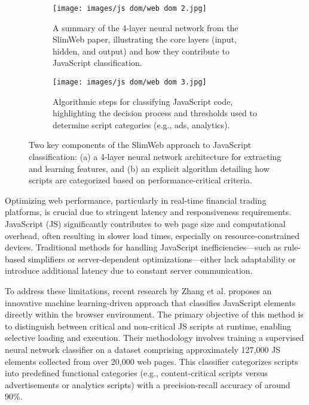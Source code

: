 \documentclass[a4paper, 11pt, twoside, openright]{report}
\begin{document}
\begin{figure}[ht]
    \centering
    \begin{subfigure}{0.45\textwidth}
        \centering
        \texttt{[image: images/js dom/web dom 2.jpg]}
        \caption{A summary of the 4-layer neural network from the SlimWeb paper, illustrating the core layers (input, hidden, and output) and how they contribute to JavaScript classification.}
        \label{fig:slimweb_nn}
    \end{subfigure}
    \hfill
    \begin{subfigure}{0.45\textwidth}
        \centering
        \texttt{[image: images/js dom/web dom 3.jpg]}
        \caption{Algorithmic steps for classifying JavaScript code, highlighting the decision process and thresholds used to determine script categories (e.g., ads, analytics).}
        \label{fig:slimweb_jsclass}
    \end{subfigure}
    \caption{Two key components of the SlimWeb approach to JavaScript classification: (a) a 4-layer neural network architecture for extracting and learning features, and (b) an explicit algorithm detailing how scripts are categorized based on performance-critical criteria.}
    \label{fig:slimweb_nn_and_algorithm}
\end{figure}


Optimizing web performance, particularly in real-time financial trading platforms, is crucial due to stringent latency and responsiveness requirements. JavaScript (JS) significantly contributes to web page size and computational overhead, often resulting in slower load times, especially on resource-constrained devices. Traditional methods for handling JavaScript inefficiencies—such as rule-based simplifiers or server-dependent optimizations—either lack adaptability or introduce additional latency due to constant server communication.

To address these limitations, recent research by Zhang et al. proposes an innovative machine learning-driven approach that classifies JavaScript elements directly within the browser environment. The primary objective of this method is to distinguish between critical and non-critical JS scripts at runtime, enabling selective loading and execution. Their methodology involves training a supervised neural network classifier on a dataset comprising approximately 127,000 JS elements collected from over 20,000 web pages. This classifier categorizes scripts into predefined functional categories (e.g., content-critical scripts versus advertisements or analytics scripts) with a precision-recall accuracy of around 90\%.
\end{document}
